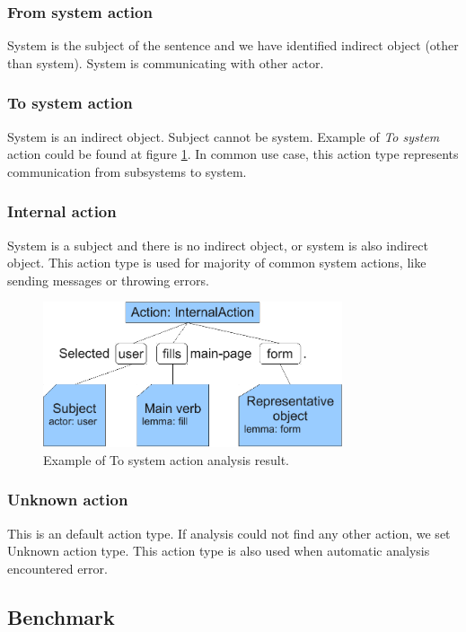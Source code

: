 \subsubsection{From system action}
System is the subject of the sentence and we have identified indirect object (other than system). System is communicating with other actor.

\subsubsection{To system action}
System is an indirect object. Subject cannot be system. Example of \emph{To system} action could be found at figure \ref{fig:ToSystemActionExample}. In common use case, this action type represents communication from subsystems to system.

\subsubsection{Internal action}
System is a subject and there is no indirect object, or system is also indirect object. This action type is used for majority of common system actions, like sending messages or throwing errors.

\begin{figure}[ht]
  \centering
  \includegraphics[width=250pt]{images/ToSystemActionExample}
  \caption{Example of To system action analysis result.}
  \label{fig:ToSystemActionExample}
\end{figure}

\subsubsection{Unknown action}
This is an default action type. If analysis could not find any other action, we set Unknown action type. This action type is also used when automatic analysis encountered error. 

\subsection{Benchmark}
\label{sec:benchmark}

